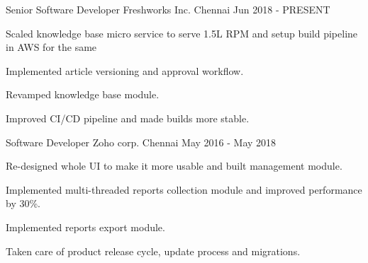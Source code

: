 
\begin{cventries}
  \cventry
    {Senior Software Developer} %
    {Freshworks Inc.} %
    {Chennai} %
    {Jun 2018 - PRESENT} %
    {
      \begin{cvitems} %
        \item {Scaled knowledge base micro service to serve 1.5L RPM and setup build pipeline in AWS for the same}
        \item {Implemented article versioning and approval workflow.}
        \item {Revamped knowledge base module.}
        \item {Improved CI/CD pipeline and made builds more stable.}
      \end{cvitems}
    }

  \cventry
    {Software Developer} %
    {Zoho corp.} %
    {Chennai} %
    {May 2016 - May 2018} %
    {
      \begin{cvitems} %
        \item {Re-designed whole UI to make it more usable and built management module.}
        \item {Implemented multi-threaded reports collection module and improved performance by 30\%.}
        \item {Implemented reports export module.}
        \item {Taken care of product release cycle, update process and migrations.}
      \end{cvitems}
    }    
\end{cventries}
